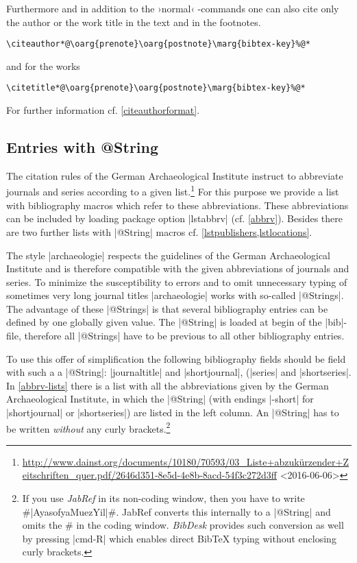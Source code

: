 \documentclass[a4paper,
10pt,
greek,
french,
spanish,
italian,
ngerman,
english
]{ltxdoc}
\begin{document}
\DescribeMacro{\citeauthor}\DescribeMacro{\citetitle}\label{citeauthor}%
Furthermore and in addition to the ›normal‹ -commands one can also cite only the author or the work title in the text and in the footnotes.
\begin{lstlisting}
\citeauthor*@\oarg{prenote}\oarg{postnote}\marg{bibtex-key}%@*
\end{lstlisting} 
  and for the works 
\begin{lstlisting}
\citetitle*@\oarg{prenote}\oarg{postnote}\marg{bibtex-key}%@*
\end{lstlisting} 
For further information cf. \cref{citeauthorformat}.


\subsection{Entries with @String}\label{string}
The citation rules of the German Archaeological Institute instruct to abbreviate journals and series according to a given list.\footnote{\url{http://www.dainst.org/documents/10180/70593/03_Liste+abzukürzender+Zeitschriften_quer.pdf/2646d351-8e5d-4e8b-8acd-54f3c272d3ff} <2016-06-06>}
For this purpose we provide a list with bibliography macros which refer to these abbreviations. 
These abbreviations can be included by loading package option |lstabbrv| (cf. \cref{abbrv}). 
Besides there are two further lists with |@String| macros cf. \cref{lstpublishers,lstlocations}.

 The style |archaeologie| respects the guidelines of the German Archaeological Institute 
and is therefore compatible with the given abbreviations of journals and series.
To minimize the susceptibility to errors and to omit unnecessary typing of sometimes very long journal titles |archaeologie| works with so-called |@Strings|.
The advantage of these |@Strings| is that several bibliography entries can be defined by one globally given value. 
The |@String| is loaded at begin of the |bib|-file, therefore all |@Strings| have to be previous to all other bibliography entries.
 
To use this offer of simplification the following bibliography fields should be field with such a a |@String|: |journaltitle| and |shortjournal|,
(|series| and |shortseries|.
In \cref{abbrv-lists} there is a list with all the abbreviations given by the German Archaeological Institute, 
in which the |@String| (with endings |-short| for |shortjournal| or |shortseries|) are listed in the left column.  
An |@String| has to be written \emph{without} any curly brackets.\footnote{If you use \emph{JabRef} in its non-coding window, 
then you have to write \#|AyasofyaMuezYil|\#. JabRef converts this internally to a |@String| and omits the \# in the coding window. 
\emph{BibDesk} provides such conversion as well by pressing |cmd-R| which enables direct BibTeX typing without enclosing curly brackets.}
\end{document}
